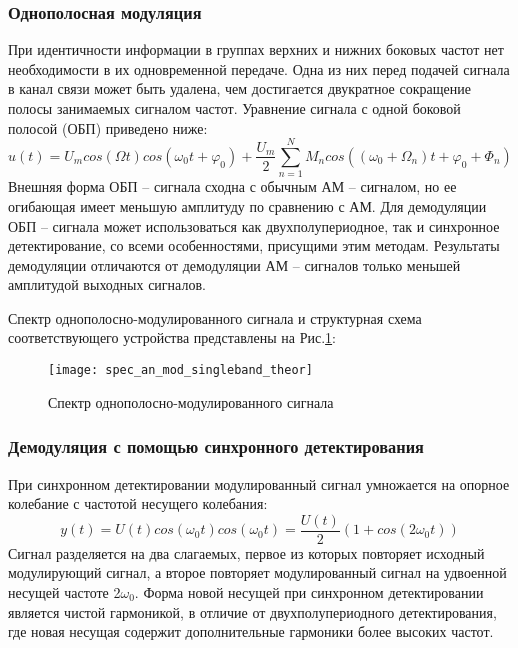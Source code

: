 \subsubsection{Однополосная модуляция}
При идентичности информации в группах верхних и нижних боковых частот нет необходимости в их одновременной передаче. Одна из них перед подачей сигнала в канал связи может быть удалена, чем достигается двукратное сокращение полосы занимаемых сигналом частот. Уравнение сигнала с одной боковой полосой (ОБП) приведено ниже:
 \begin{equation}
	u(t) = U_m cos(\Omega t) cos(\omega_0 t + \varphi _0) + \frac{U_m}{2} \sum_{n=1}^{N}  M_n cos((\omega_0 + \Omega_n) t + \varphi _0 + \Phi _n)
\end{equation}
Внешняя форма ОБП – сигнала сходна с обычным АМ – сигналом, но ее огибающая имеет меньшую амплитуду по сравнению с АМ. Для демодуляции ОБП – сигнала может использоваться как двухполупериодное, так и синхронное детектирование, со всеми особенностями, присущими этим методам. Результаты демодуляции отличаются от демодуляции АМ – сигналов только меньшей амплитудой выходных сигналов.

Спектр однополосно-модулированного сигнала и структурная схема соответствующего устройства представлены на Рис.\ref{pic:spec_an_mod_singleband_theor}:
\begin{figure}[H]
	\begin{center}
		\texttt{[image: spec\_an\_mod\_singleband\_theor]}
		\caption{Спектр однополосно-модулированного сигнала} 
		\label{pic:spec_an_mod_singleband_theor} %
	\end{center}
\end{figure}

\subsubsection{Демодуляция с помощью синхронного детектирования}
При синхронном детектировании модулированный сигнал умножается на опорное колебание с частотой несущего колебания:
 \begin{equation}
	y(t) = U(t) cos(\omega_0 t) cos(\omega_0 t) = \frac{U(t)}{2} (1 + cos(2\omega_0 t))
\end{equation}
Сигнал разделяется на два слагаемых, первое из которых повторяет исходный модулирующий сигнал, а второе повторяет модулированный сигнал на удвоенной несущей частоте 2$\omega_0$. Форма новой несущей при синхронном детектировании является чистой гармоникой, в отличие от двухполупериодного детектирования, где новая несущая содержит дополнительные гармоники более высоких частот. 

